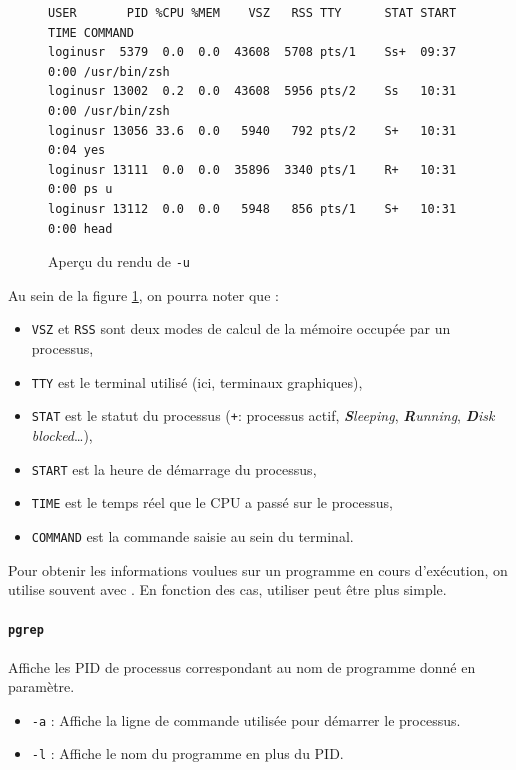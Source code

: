 \vspace{3mm}
\begin{figure}[bh!]
    \centering
    \begin{verbatim}
USER       PID %CPU %MEM    VSZ   RSS TTY      STAT START   TIME COMMAND
loginusr  5379  0.0  0.0  43608  5708 pts/1    Ss+  09:37   0:00 /usr/bin/zsh
loginusr 13002  0.2  0.0  43608  5956 pts/2    Ss   10:31   0:00 /usr/bin/zsh
loginusr 13056 33.6  0.0   5940   792 pts/2    S+   10:31   0:04 yes
loginusr 13111  0.0  0.0  35896  3340 pts/1    R+   10:31   0:00 ps u
loginusr 13112  0.0  0.0   5948   856 pts/1    S+   10:31   0:00 head
\end{verbatim}
    \vspace{-\baselineskip}\caption{Aperçu du rendu de  \texttt{-u}}
    \label{fig:ps}
\end{figure}
Au sein de la figure \ref{fig:ps}, on pourra noter que : 
\begin{itemize}
    \item \texttt{VSZ} et \texttt{RSS} sont deux modes de calcul de la mémoire occupée par un processus,
    \item \texttt{TTY} est le terminal utilisé (ici, terminaux graphiques),
    \item \texttt{STAT} est le statut du processus (\texttt{+}: processus actif, \textit{\textbf{S}leeping}, \textit{\textbf{R}unning}, \textit{\textbf{D}isk blocked}\dots),
    \item \texttt{START} est la heure de démarrage du processus,
    \item \texttt{TIME} est le temps réel que le CPU a passé sur le processus,
    \item \texttt{COMMAND} est la commande saisie au sein du terminal.
\end{itemize}

Pour obtenir les informations voulues sur un programme en cours d'exécution, on utilise souvent  avec . En fonction des cas, utiliser  peut être plus simple.

\paragraph{\texttt{pgrep}} 
Affiche les PID de processus correspondant au nom de programme donné en paramètre.
\begin{itemize}
    \item \texttt{-a} : Affiche la ligne de commande utilisée pour démarrer le processus.
    \item \texttt{-l} : Affiche le nom du programme en plus du PID.
\end{itemize}


